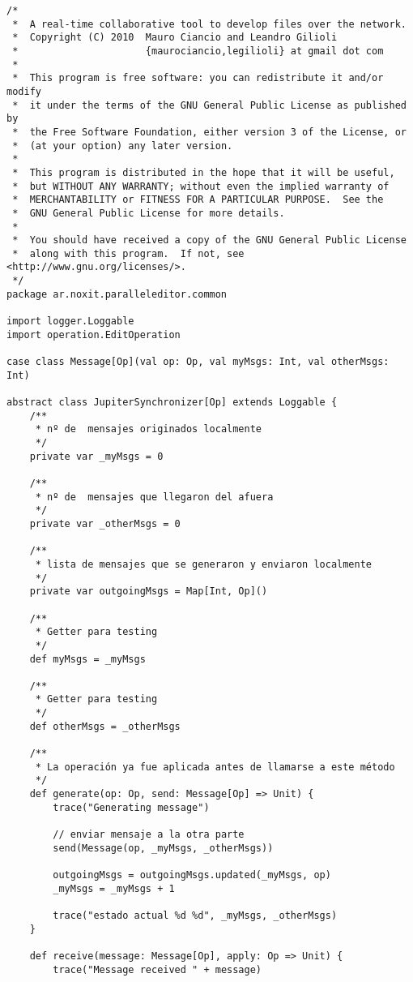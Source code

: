 {
\tiny
\begin{verbatim}
/*
 *  A real-time collaborative tool to develop files over the network.
 *  Copyright (C) 2010  Mauro Ciancio and Leandro Gilioli
 *                      {maurociancio,legilioli} at gmail dot com
 *
 *  This program is free software: you can redistribute it and/or modify
 *  it under the terms of the GNU General Public License as published by
 *  the Free Software Foundation, either version 3 of the License, or
 *  (at your option) any later version.
 *
 *  This program is distributed in the hope that it will be useful,
 *  but WITHOUT ANY WARRANTY; without even the implied warranty of
 *  MERCHANTABILITY or FITNESS FOR A PARTICULAR PURPOSE.  See the
 *  GNU General Public License for more details.
 *
 *  You should have received a copy of the GNU General Public License
 *  along with this program.  If not, see <http://www.gnu.org/licenses/>.
 */
package ar.noxit.paralleleditor.common

import logger.Loggable
import operation.EditOperation

case class Message[Op](val op: Op, val myMsgs: Int, val otherMsgs: Int)

abstract class JupiterSynchronizer[Op] extends Loggable {
    /**
     * nº de  mensajes originados localmente
     */
    private var _myMsgs = 0

    /**
     * nº de  mensajes que llegaron del afuera
     */
    private var _otherMsgs = 0

    /**
     * lista de mensajes que se generaron y enviaron localmente
     */
    private var outgoingMsgs = Map[Int, Op]()

    /**
     * Getter para testing
     */
    def myMsgs = _myMsgs

    /**
     * Getter para testing
     */
    def otherMsgs = _otherMsgs

    /**
     * La operación ya fue aplicada antes de llamarse a este método
     */
    def generate(op: Op, send: Message[Op] => Unit) {
        trace("Generating message")

        // enviar mensaje a la otra parte
        send(Message(op, _myMsgs, _otherMsgs))

        outgoingMsgs = outgoingMsgs.updated(_myMsgs, op)
        _myMsgs = _myMsgs + 1

        trace("estado actual %d %d", _myMsgs, _otherMsgs)
    }

    def receive(message: Message[Op], apply: Op => Unit) {
        trace("Message received " + message)


\end{verbatim}}

